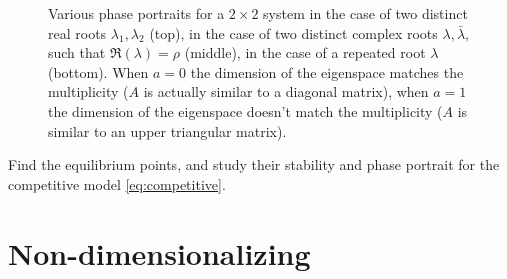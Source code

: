 \begin{figure}[H]
  \caption{Various phase portraits for a $2 \times 2$ system in the case of two distinct real roots $\lambda_1, \lambda_2$ (top), in the case of two distinct complex roots $\lambda, \bar{\lambda}$, such that $\Re(\lambda) = \rho$ (middle), in the case of a repeated root $\lambda$ (bottom). When $a = 0$ the dimension of the eigenspace matches the multiplicity ($A$ is actually similar to a diagonal matrix), when $a  = 1$ the dimension of the eigenspace doesn't match the multiplicity ($A$ is similar to an upper triangular matrix).}
  \label{fig:root1}
 \end{figure}


 \begin{Exercise}
Find the equilibrium points, and study their stability and phase portrait for the competitive model \eqref{eq:competitive}.\\
  \dotfill

\dotfill

\dotfill

\dotfill

\dotfill

\dotfill

\dotfill

\dotfill

\dotfill

\dotfill
 \end{Exercise}

\section{Non-dimensionalizing}

